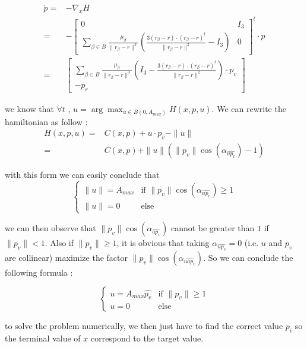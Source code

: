 \documentclass{article} %
\begin{document}
{			$$
			\begin{align}
				\dot{p}=&-\nabla _{x}H\\
				=&-\begin{bmatrix}
					0 & I_3\\
					\sum\limits _{\beta \in B }\frac{\mu _{\beta }}{\| r_{\beta } -r\| ^{3}}\left(\frac{3( r_{\beta } -r) \cdot ( r_{\beta } -r)^{t}}{\| r_{\beta } -r\| ^{2}} -I_3\right) & 0
				\end{bmatrix}^{t} \cdot p\\
				=&\begin{bmatrix}
					\sum\limits _{\beta \in B }\frac{\mu _{\beta }}{\| r_{\beta } -r\| ^{3}}\left(I_3-\frac{3( r_{\beta } -r) \cdot ( r_{\beta } -r)^{t}}{\| r_{\beta } -r\| ^{2}} \right)\cdot p_v\\
					-p_r
				\end{bmatrix}
			\end{align}
			$$
			
			we know that $\forall t$ , $u=\arg\max_{u\in B(0,A_{max})}H(x,p,u)$. We can rewrite the hamiltonian as follow : 
			$$
			\begin{align}
				H(x,p,u)=&C(x,p)+u\cdot p_v-\|u\| \\
				=&C(x,p)+\|u\|(\|p_v\|\cos(\alpha_{\widehat{up_v}})-1)
			\end{align}
			$$ 
			
			with this form we can easily conclude that 
			$$
			\begin{cases}
				\| u\| =A_{max} & \text{if } \|p_v\|\cos(\alpha_{\widehat{up_v}})\ge1\\
				\| u\| =0 & \text{else}
			\end{cases}
			$$
			
			we can then observe that $\|p_v\|\cos(\alpha_{\widehat{ap_v}})$ cannot be greater than $1$ if $\|p_v\| < 1$. Also if $\|p_v\| \ge 1$, it is obvious that taking $\alpha_{\widehat{up_v}}=0$ (i.e. $u$ and $p_v$ are collinear) maximize the factor $\|p_v\|\cos(\alpha_{\widehat{uap_v}})$. So we can conclude the following formula :
			
			$$
			\begin{cases}
				 u =A_{max}\widehat{p_v} & \text{if }\|p_v\| \ge 1\\
				 u =0 & \text{else}
			\end{cases}
			$$
			
			to solve the problem numerically, we then just have to find the correct value $p_i$ so the terminal value of $x$ correspond to the target value.
			
}
\end{document}
